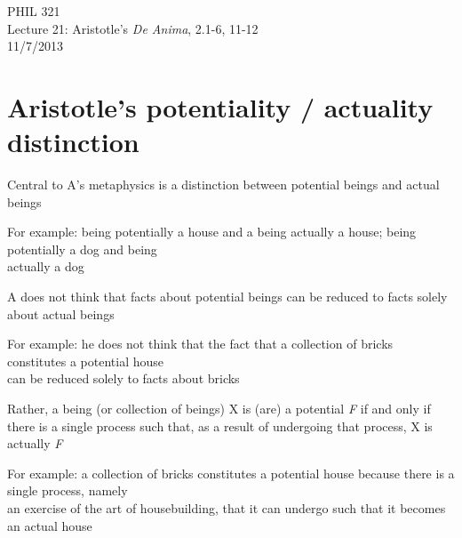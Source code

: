 \documentclass[11pt]{article}
\begin{document}
\thispagestyle{empty}
\begin{center} \LARGE{PHIL 321\\ Lecture 21: Aristotle's \emph{De Anima}, 2.1-6, 11-12}\\ \vspace*{2mm}
\large{11/7/2013}\end{center}
\thispagestyle{empty}\vspace*{3mm}
\vspace*{-8mm}

\section*{Aristotle's potentiality / actuality distinction}

\noindent Central to A's metaphysics is a distinction between potential beings and actual beings
\vspace*{2mm}

For example: being potentially a house and a being actually a house; being potentially a dog and being \\\hspace*{6mm}actually a dog
\vspace*{2mm}

\noindent A does not think that facts about potential beings can be reduced to facts solely about actual beings
\vspace*{2mm}

For example: he does not think that the fact that a collection of bricks constitutes a potential house\\\hspace*{6mm}can be reduced solely to facts about bricks
\vspace*{2mm}

\noindent Rather, a being (or collection of beings) X is (are) a potential \emph{F} if and only if there is a single process such that, as a result of undergoing that process, X is actually \emph{F}
\vspace*{2mm}

For example: a collection of bricks constitutes a potential house because there is a single process, namely\\\hspace*{6mm}an exercise of the art of housebuilding, that it can undergo such that it becomes an actual house
\vspace*{2mm}
\end{document}
